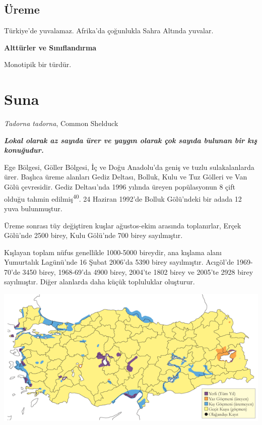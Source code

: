 \documentclass[
  letterpaper,
  DIV=11,
  numbers=noendperiod]{scrreprt}
\begin{document}
\hypertarget{uxfcreme-10}{%
\subsection{\texorpdfstring{\textbf{Üreme}}{Üreme}}\label{uxfcreme-10}}

Türkiye'de yuvalamaz. Afrika'da çoğunlukla Sahra Altında yuvalar.

\textbf{Alttürler ve Sınıflandırma}

Monotipik bir türdür.

\hypertarget{suna}{%
\section{Suna}\label{suna}}

\emph{Tadorna tadorna}, Common Shelduck

\textbf{\emph{Lokal olarak az sayıda ürer ve yaygın olarak çok sayıda
bulunan bir kış konuğudur.}}

Ege Bölgesi, Göller Bölgesi, İç ve Doğu Anadolu'da geniş ve tuzlu
sulakalanlarda ürer. Başlıca üreme alanları Gediz Deltası, Bolluk, Kulu
ve Tuz Gölleri ve Van Gölü çevresidir. Gediz Deltası'nda 1996 yılında
üreyen popülasyonun 8 çift olduğu tahmin edilmiş\textsuperscript{40}. 24
Haziran 1992'de Bolluk Gölü'ndeki bir adada 12 yuva bulunmuştur.

Üreme sonrası tüy değiştiren kuşlar ağustos-ekim arasında toplanırlar,
Erçek Gölü'nde 2500 birey, Kulu Gölü'nde 700 birey sayılmıştır.

Kışlayan toplam nüfus genellikle 1000-5000 bireydir, ana kışlama alanı
Yumurtalık Lagünü'nde 16 Şubat 2006'da 5390 birey sayılmıştır. Acıgöl'de
1969-70'de 3450 birey, 1968-69'da 4900 birey, 2004'te 1802 birey ve
2005'te 2928 birey sayılmıştır. Diğer alanlarda daha küçük topluluklar
oluşturur.

\includegraphics{images/harita_Page_012.png}
\end{document}
